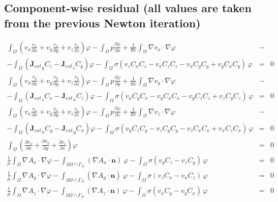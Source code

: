 \documentclass[smallextended]{svjour3}       %
\begin{document}
		\subsection{Component-wise residual (all values are taken from the previous Newton iteration)}
		\begin{eqnarray}
			\int_{\Omega} \left({v_x} \frac{v_x}{\partial x} + v_y \frac{v_x}{\partial y} + v_z \frac{v_x}{\partial z}\right) \varphi
			- \int_{\Omega} p \frac{\partial \varphi}{\partial x}
			+ \frac{1}{Re} \int_{\Omega} \nabla v_x \cdot \nabla \varphi
			\nonumber & -\\
			- \int_{\Omega} \left({\mathbf{J}_{ext}}_y C_z - {\mathbf{J}_{ext}}_z C_y\right) \varphi			
			- \int_{\Omega} \sigma \left(v_z C_x C_z - v_x C_z C_z - v_x C_y C_y + v_y C_x C_y\right)\, \varphi
			& = & 0\nonumber \\
			\int_{\Omega} \left(v_x \frac{v_y}{\partial x} + v_y \frac{v_y}{\partial y} + v_z \frac{v_y}{\partial z}\right) \varphi
			- \int_{\Omega} p \frac{\partial \varphi}{\partial y}
			+ \frac{1}{Re} \int_{\Omega} \nabla v_y \cdot \nabla \varphi
			\nonumber & -\\
			- \int_{\Omega} \left({\mathbf{J}_{ext}}_z C_x - {\mathbf{J}_{ext}}_x C_z\right) \varphi			
			- \int_{\Omega} \sigma \left(v_x C_y C_x - v_y C_x C_x - v_y C_z C_z + v_z C_y C_z\right)\, \varphi
			& = & 0\nonumber \\
			\int_{\Omega} \left(v_x \frac{v_z}{\partial x} + v_y \frac{v_z}{\partial y} + v_z \frac{v_z}{\partial z}\right) \varphi
			- \int_{\Omega} p \frac{\partial \varphi}{\partial z}
			+ \frac{1}{Re} \int_{\Omega} \nabla v_z \cdot \nabla \varphi
			\nonumber & -\\
			- \int_{\Omega} \left({\mathbf{J}_{ext}}_x C_y - {\mathbf{J}_{ext}}_y C_x\right) \varphi			
			- \int_{\Omega} \sigma \left(v_y C_z C_y - v_z C_y C_y - v_z C_x C_x + v_x C_z C_x\right)\, \varphi
			& = & 0\nonumber \\			
			\int_{\Omega} \left(\frac{\partial v_x}{\partial x} + \frac{\partial v_y}{\partial y} + \frac{\partial v_z}{\partial z}\right) \varphi & = & 0\nonumber \\
			\frac{1}{\mu}\int_{\Omega}\nabla A_x \cdot \nabla \varphi - \int_{\partial \Omega \cap \Gamma_{N}} \left(\nabla A_x\cdot \mathbf{n}\right)\ \varphi 
			 - \int_{\Omega} \sigma \left(v_y C_z - v_z C_y\right)\,\varphi & = & 0\nonumber \\
			\frac{1}{\mu}\int_{\Omega}\nabla A_y \cdot \nabla \varphi - \int_{\partial \Omega \cap \Gamma_{N}} \left(\nabla A_y\cdot \mathbf{n}\right)\ \varphi 
			 - \int_{\Omega} \sigma \left(v_z C_x - v_x C_z\right)\,\varphi & = & 0\nonumber \\
			\frac{1}{\mu}\int_{\Omega}\nabla A_z \cdot \nabla \varphi - \int_{\partial \Omega \cap \Gamma_{N}} \left(\nabla A_z\cdot \mathbf{n}\right)\ \varphi 
			 - \int_{\Omega} \sigma \left(v_x C_y - v_y C_x\right)\,\varphi & = & 0\nonumber \\
			 \nonumber 
		\end{eqnarray}
		
\end{document}
